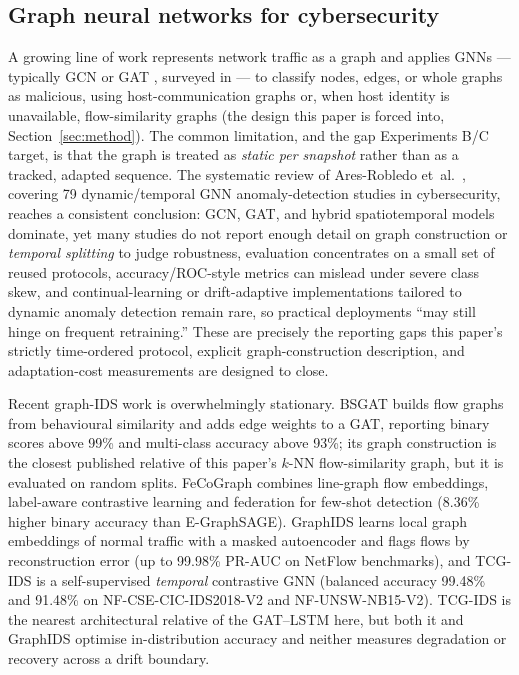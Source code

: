\documentclass[twocolumn]{llncs}
\begin{document}
\subsection{Graph neural networks for cybersecurity}

A growing line of work represents network traffic as a graph and applies GNNs --- typically GCN
\cite{kipf2017gcn} or GAT \cite{velickovic2018gat}, surveyed in \cite{zhou2020gnnreview} --- to
classify nodes, edges, or whole graphs as malicious, using host-communication graphs or, when host
identity is unavailable, flow-similarity graphs (the design this paper is forced into,
Section~\ref{sec:method}). The common limitation, and the gap Experiments B/C target, is that the
graph is treated as \emph{static per snapshot} rather than as a tracked, adapted sequence.
The systematic review of Ares-Robledo et~al.\ \cite{aresrobledo2026gnnsurvey}, covering 79
dynamic/temporal GNN anomaly-detection studies in cybersecurity, reaches a consistent conclusion:
GCN, GAT, and hybrid spatiotemporal models dominate, yet many studies do not report enough detail on
graph construction or \emph{temporal splitting} to judge robustness, evaluation concentrates on a
small set of reused protocols, accuracy/ROC-style metrics can mislead under severe class skew, and
continual-learning or drift-adaptive implementations tailored to dynamic anomaly detection remain
rare, so practical deployments ``may still hinge on frequent retraining.'' These are precisely the
reporting gaps this paper's strictly time-ordered protocol, explicit graph-construction description,
and adaptation-cost measurements are designed to close.


Recent graph-IDS work is overwhelmingly stationary. BSGAT \cite{wang2025bsgat} builds flow graphs
from behavioural similarity and adds edge weights to a GAT, reporting binary scores above 99\% and
multi-class accuracy above 93\%; its graph construction is the closest published relative of this
paper's $k$-NN flow-similarity graph, but it is evaluated on random splits. FeCoGraph
\cite{mao2025fecograph} combines line-graph flow embeddings, label-aware contrastive learning and
federation for few-shot detection (8.36\% higher binary accuracy than E-GraphSAGE). GraphIDS
\cite{guerra2025graphids} learns local graph embeddings of normal traffic with a masked autoencoder
and flags flows by reconstruction error (up to 99.98\% PR-AUC on NetFlow benchmarks), and TCG-IDS
\cite{wu2025tcgids} is a self-supervised \emph{temporal} contrastive GNN (balanced accuracy 99.48\%
and 91.48\% on NF-CSE-CIC-IDS2018-V2 and NF-UNSW-NB15-V2). TCG-IDS is the nearest architectural
relative of the GAT--LSTM here, but both it and GraphIDS optimise in-distribution accuracy and
neither measures degradation or recovery across a drift boundary.
\end{document}
